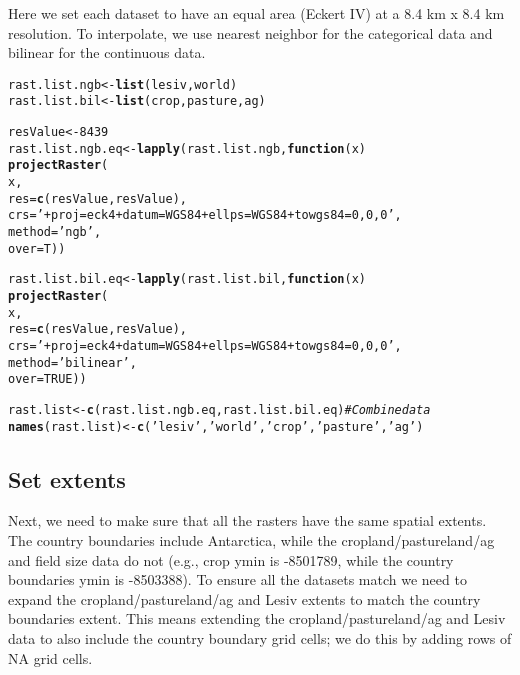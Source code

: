 \documentclass{article}\usepackage[]{graphicx}\usepackage[]{xcolor}
\makeatletter
\newcommand{\hlnum}[1]{\textcolor[rgb]{0.686,0.059,0.569}{#1}}%
\newcommand{\hlstr}[1]{\textcolor[rgb]{0.192,0.494,0.8}{#1}}%
\newcommand{\hlcom}[1]{\textcolor[rgb]{0.678,0.584,0.686}{\textit{#1}}}%
\newcommand{\hlstd}[1]{\textcolor[rgb]{0.345,0.345,0.345}{#1}}%
\newcommand{\hlkwa}[1]{\textcolor[rgb]{0.161,0.373,0.58}{\textbf{#1}}}%
\newcommand{\hlkwb}[1]{\textcolor[rgb]{0.69,0.353,0.396}{#1}}%
\newcommand{\hlkwc}[1]{\textcolor[rgb]{0.333,0.667,0.333}{#1}}%
\newcommand{\hlkwd}[1]{\textcolor[rgb]{0.737,0.353,0.396}{\textbf{#1}}}%
\newenvironment{kframe}{%
 \def\at@end@of@kframe{}%
 \ifinner\ifhmode%
  \def\at@end@of@kframe{\end{minipage}}%
  \begin{minipage}{\columnwidth}%
 \fi\fi%
 \def\FrameCommand##1{\hskip\@totalleftmargin \hskip-\fboxsep
 \colorbox{shadecolor}{##1}\hskip-\fboxsep
     \hskip-\linewidth \hskip-\@totalleftmargin \hskip\columnwidth}%
 \MakeFramed {\advance\hsize-\width
   \@totalleftmargin\z@ \linewidth\hsize
   \@setminipage}}%
 {\par\unskip\endMakeFramed%
 \at@end@of@kframe}
\newenvironment{knitrout}{}{} %
\makeatother
\begin{document}
Here we set each dataset to have an equal area (Eckert IV) at a 8.4 km x 8.4 km resolution. To interpolate, we use nearest neighbor for the categorical data and bilinear for the continuous data.

\begin{knitrout}
\color{fgcolor}\begin{kframe}
\begin{alltt}
\hlstd{rast.list.ngb} \hlkwb{<-} \hlkwd{list}\hlstd{(lesiv, world)}
\hlstd{rast.list.bil} \hlkwb{<-} \hlkwd{list}\hlstd{(crop, pasture, ag)}

\hlstd{resValue} \hlkwb{<-} \hlnum{8439}
\hlstd{rast.list.ngb.eq} \hlkwb{<-} \hlkwd{lapply}\hlstd{(rast.list.ngb,} \hlkwa{function}\hlstd{(}\hlkwc{x}\hlstd{)}
  \hlkwd{projectRaster}\hlstd{(}
    \hlstd{x,}
    \hlkwc{res}    \hlstd{=} \hlkwd{c}\hlstd{(resValue, resValue),}
    \hlkwc{crs}    \hlstd{=} \hlstr{'+proj=eck4 +datum=WGS84 +ellps=WGS84 +towgs84=0,0,0'}\hlstd{,}
    \hlkwc{method} \hlstd{=} \hlstr{'ngb'}\hlstd{,}
    \hlkwc{over}   \hlstd{= T))}

\hlstd{rast.list.bil.eq} \hlkwb{<-} \hlkwd{lapply}\hlstd{(rast.list.bil,} \hlkwa{function}\hlstd{(}\hlkwc{x}\hlstd{)}
  \hlkwd{projectRaster}\hlstd{(}
    \hlstd{x,}
    \hlkwc{res}    \hlstd{=} \hlkwd{c}\hlstd{(resValue, resValue),}
    \hlkwc{crs}    \hlstd{=} \hlstr{'+proj=eck4 +datum=WGS84 +ellps=WGS84 +towgs84=0,0,0'}\hlstd{,}
    \hlkwc{method} \hlstd{=} \hlstr{'bilinear'}\hlstd{,}
    \hlkwc{over}   \hlstd{=} \hlnum{TRUE}\hlstd{))}

\hlstd{rast.list} \hlkwb{<-} \hlkwd{c}\hlstd{(rast.list.ngb.eq, rast.list.bil.eq)}  \hlcom{# Combine data}
\hlkwd{names}\hlstd{(rast.list)} \hlkwb{<-} \hlkwd{c}\hlstd{(}\hlstr{'lesiv'}\hlstd{,} \hlstr{'world'}\hlstd{,} \hlstr{'crop'}\hlstd{,} \hlstr{'pasture'}\hlstd{,} \hlstr{'ag'}\hlstd{)}
\end{alltt}
\end{kframe}
\end{knitrout}

\subsection{Set extents}

Next, we need to make sure that all the rasters have the same spatial extents. The country boundaries include Antarctica, while the cropland/pastureland/ag and field size data do not (e.g., crop ymin is -8501789, while the country boundaries ymin is -8503388). To ensure all the datasets match we need to expand the cropland/pastureland/ag and Lesiv extents to match the country boundaries extent. This means extending the cropland/pastureland/ag and Lesiv data to also include the country boundary grid cells; we do this by adding rows of NA grid cells.
\end{document}
